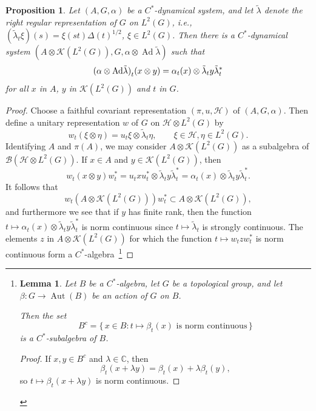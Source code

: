 \documentclass{book}
\newtheorem{lemma}[definition]{Lemma}
\newtheorem{proposition}[definition]{Proposition}
\def\cstar{\(C^*\)-algebra}
\begin{document}
\begin{proposition}\label{Petersen:7711}
  Let \((A, G, \alpha)\) be a \(C^*\)-dynamical system, and let \(\tilde{\lambda}\) denote the right regular representation of \(G\) on \(L^2(G)\),
  i.e., \((\tilde{\lambda}_t\xi)(s)=\xi(st){\Delta(t)}^{1/2}\), \(\xi\in L^2(G)\).
  Then there is a \(C^*\)-dynamical system \((A\otimes\mathcal{K}(L^2(G)), G, \alpha\otimes\operatorname{Ad}\tilde{\lambda})\) such that
  \[
    {(\alpha\otimes \textnormal{Ad}\tilde{\lambda})}_t(x\otimes y)=\alpha_t(x)\otimes\tilde{\lambda}_t y \tilde{\lambda}_t^*
  \]
  for all \(x\) in \(A\), \(y\) in \(\mathcal{K}(L^2(G))\) and \(t\) in \(G\).
\end{proposition}
\begin{proof}
  Choose a faithful covariant representation \((\pi, u, \mathcal{H})\) of \((A, G, \alpha)\).
  Then define a unitary representation \(w\) of \(G\) on \(\mathcal{H}\otimes L^2(G)\) by
  \[
    w_t(\xi\otimes\eta)=u_t\xi\otimes\tilde{\lambda}_t\eta,\qquad \xi\in \mathcal{H}, \eta\in L^2(G).
  \]
  Identifying \(A\) and \(\pi(A)\), we may consider \(A\otimes\mathcal{K}(L^2(G))\) as a subalgebra of
  \(\mathcal{B}(\mathcal{H}\otimes L^2(G))\). If \(x\in A\) and \(y\in\mathcal{K}(L^2(G))\), then
  \[
    w_t(x\otimes y)w_t^*=u_t x u_t^*\otimes\tilde{\lambda}_t y\tilde{\lambda}_t^*=\alpha_t(x)\otimes \tilde{\lambda}_t y\tilde{\lambda}_t^*.
  \]
  It follows that
  \[
    w_t(A\otimes\mathcal{K}(L^2(G)))w_t^*\subset A\otimes\mathcal{K}(L^2(G)),
  \]
  and furthermore we see that if \(y\) has finite rank, then the function \(t\mapsto\alpha_t(x)\otimes\tilde{\lambda}_t y\tilde{\lambda}_t^*\)
  is norm continuous since \(t\mapsto\tilde{\lambda}_t\) is strongly continuous.
  The elements \(z\) in \(A\otimes\mathcal{K}(L^2(G))\) for which the function \(t\mapsto w_t z w_t^*\)
  is norm continuous form a \cstar\ \footnote{
    \begin{lemma} 
      Let \(B\) be a \(C^*\)-algebra, let \(G\) be a topological group, and let
      \(\beta:G\to\operatorname{Aut}(B)\) be an action of \(G\) on \(B\).

      Then the set
      \[
      B^c=
      \{\,x\in B : t\mapsto \beta_t(x)
      \text{ is norm continuous}\,\}
      \]
      is a \(C^*\)-subalgebra of \(B\).
    \end{lemma}

    \begin{proof}
      If \(x,y\in B^c\) and \(\lambda\in\mathbb C\), then
      \[
      \beta_t(x+\lambda y)
      =
      \beta_t(x)+\lambda\beta_t(y),
      \]
      so \(t\mapsto\beta_t(x+\lambda y)\) is norm continuous.


\end{proof}}
\end{proof}
\end{document}
